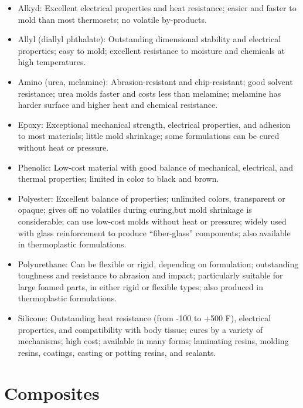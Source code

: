 \documentclass[
10pt,
a4paper,
openany,
svgnames,
]{book}
\begin{document}
\begin{itemize}[label=\scriptsize$\square$]
\item Alkyd: Excellent electrical properties and heat resistance; easier and faster to mold than most thermosets; no volatile by-products.

\item Allyl (diallyl phthalate): Outstanding dimensional stability and electrical properties; easy to mold; excellent resistance to moisture and chemicals at high temperatures. 

\item Amino (urea, melamine): Abrasion-resistant and chip-resistant; good solvent resistance; urea molds faster and costs less than melamine; melamine has harder surface and higher heat and chemical resistance.

\item Epoxy: Exceptional mechanical strength, electrical properties, and adhesion to most materials; little mold shrinkage; some formulations can be cured without heat or pressure. 

\item Phenolic: Low-cost material with good balance of mechanical, electrical, and thermal properties; limited in color to black and brown.

\item Polyester: Excellent balance of properties; unlimited colors, transparent or opaque; gives off no volatiles during curing,but mold shrinkage is considerable; can use low-cost molds without heat or pressure; widely used with glass reinforcement to produce “fiber-glass” components; also available in thermoplastic formulations.

\item Polyurethane: Can be flexible or rigid, depending on formulation; outstanding toughness and resistance to abrasion and impact; particularly suitable for large foamed parts, in either rigid or flexible types; also produced in thermoplastic formulations.

\item Silicone: Outstanding heat resistance (from -100 to +500 F), electrical properties, and compatibility with body tissue; cures by a variety of mechanisms; high cost; available in many forms; laminating resins, molding resins, coatings, casting or potting resins, and sealants.
\end{itemize}

\section{Composites}
\end{document}
